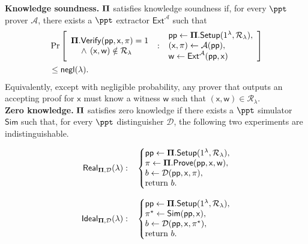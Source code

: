 \documentclass[conference,compsoc]{IEEEtran}
\newcommand{\para}{\textsf{pp}}
\newcommand{\bPi}{{\bf \Pi}}
\newcommand{\setup}{{\sf Setup}}
\newcommand{\prove}{{\sf Prove}}
\renewcommand{\verify}{{\sf Verify}}
\newcommand{\relation}{{\mathcal{R}}}
\newcommand{\stmt}{\mathsf{x}}      %
\newcommand{\wit}{\mathsf{w}}       %
\theoremstyle{plain}
\theoremstyle{definition}
\theoremstyle{remark}
\providecommand{\DIFaddtex}[1]{{\protect\color{DIFADD} \sf #1}} %
\providecommand{\DIFaddbegin}{} %
\providecommand{\DIFaddend}{} %
\providecommand{\DIFadd}[1]{\texorpdfstring{\DIFaddtex{#1}}{#1}} %
\providecommand{\DIFaddincludegraphics}[2][]{{\color{blue}\fbox{\DIFOincludegraphics[#1]{#2}}}} %
\DeclareRobustCommand{\DIFaddbegin}{\DIFOaddbegin \let\includegraphics\DIFaddincludegraphics} %
\DeclareRobustCommand{\DIFaddend}{\DIFOaddend \let\includegraphics\DIFOincludegraphics} %
\begin{document}
\noindent\textbf{Knowledge soundness.}
\(\bPi\) satisfies knowledge soundness if, for every \(\ppt\) prover
\(\mathcal{A}\), there exists  \DIFaddbegin \DIFadd{a }\DIFaddend \(\ppt\) extractor
\(\mathsf{Ext}^{\mathcal{A}}\) such that
\[
\begin{aligned}
&\Pr\left[
\begin{array}{l}
  \bPi.\verify(\para,\stmt,\pi)=1 \\
  \quad {}\wedge{}\,(\stmt,\wit)\notin\relation_\lambda
\end{array}
\;:\;
\begin{array}{l}
  \para\gets\bPi.\setup(1^\lambda,\relation_\lambda),\\
  (\stmt,\pi)\gets\mathcal{A}(\para),\\
  \wit\gets\mathsf{Ext}^{\mathcal{A}}(\para,\stmt)
\end{array}
\right] \\
&\le \textsf{negl}(\lambda).
\end{aligned}
\]
Equivalently, except with negligible probability, any prover that outputs an
accepting proof for \(\stmt\) must know a witness \(\wit\) such that
\((\stmt,\wit)\in\relation_\lambda\). \\


\noindent\textbf{Zero knowledge.}
\(\bPi\) satisfies zero knowledge if there exists a \(\ppt\) simulator
\(\mathsf{Sim}\) such that, for every \(\ppt\) distinguisher
\(\mathcal{D}\), the following two experiments are indistinguishable.

\[
\begin{aligned}
\mathsf{Real}_{\bPi,\mathcal{D}}(\lambda):
\quad
&\left\{
\begin{array}{@{}l@{}}
  \para\gets\bPi.\setup(1^\lambda,\relation_\lambda),\\
  \pi\gets\bPi.\prove(\para,\stmt,\wit),\\
  b\gets\mathcal{D}(\para,\stmt,\pi),\\
  \text{return } b.
\end{array}
\right.
\\[3mm]
\mathsf{Ideal}_{\bPi,\mathcal{D}}(\lambda):
\quad
&\left\{
\begin{array}{@{}l@{}}
  \para\gets\bPi.\setup(1^\lambda,\relation_\lambda),\\
  \pi^\star\gets\mathsf{Sim}(\para,\stmt),\\
  b\gets\mathcal{D}(\para,\stmt,\pi^\star),\\
  \text{return } b.
\end{array}
\right.
\end{aligned}
\]
\end{document}

